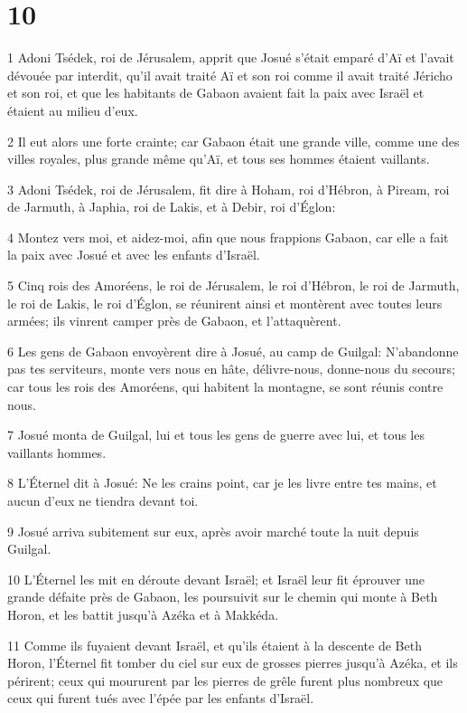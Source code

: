 \chapter{10}

\par 1 Adoni Tsédek, roi de Jérusalem, apprit que Josué s'était emparé d'Aï et l'avait dévouée par interdit, qu'il avait traité Aï et son roi comme il avait traité Jéricho et son roi, et que les habitants de Gabaon avaient fait la paix avec Israël et étaient au milieu d'eux.
\par 2 Il eut alors une forte crainte; car Gabaon était une grande ville, comme une des villes royales, plus grande même qu'Aï, et tous ses hommes étaient vaillants.
\par 3 Adoni Tsédek, roi de Jérusalem, fit dire à Hoham, roi d'Hébron, à Piream, roi de Jarmuth, à Japhia, roi de Lakis, et à Debir, roi d'Églon:
\par 4 Montez vers moi, et aidez-moi, afin que nous frappions Gabaon, car elle a fait la paix avec Josué et avec les enfants d'Israël.
\par 5 Cinq rois des Amoréens, le roi de Jérusalem, le roi d'Hébron, le roi de Jarmuth, le roi de Lakis, le roi d'Églon, se réunirent ainsi et montèrent avec toutes leurs armées; ils vinrent camper près de Gabaon, et l'attaquèrent.
\par 6 Les gens de Gabaon envoyèrent dire à Josué, au camp de Guilgal: N'abandonne pas tes serviteurs, monte vers nous en hâte, délivre-nous, donne-nous du secours; car tous les rois des Amoréens, qui habitent la montagne, se sont réunis contre nous.
\par 7 Josué monta de Guilgal, lui et tous les gens de guerre avec lui, et tous les vaillants hommes.
\par 8 L'Éternel dit à Josué: Ne les crains point, car je les livre entre tes mains, et aucun d'eux ne tiendra devant toi.
\par 9 Josué arriva subitement sur eux, après avoir marché toute la nuit depuis Guilgal.
\par 10 L'Éternel les mit en déroute devant Israël; et Israël leur fit éprouver une grande défaite près de Gabaon, les poursuivit sur le chemin qui monte à Beth Horon, et les battit jusqu'à Azéka et à Makkéda.
\par 11 Comme ils fuyaient devant Israël, et qu'ils étaient à la descente de Beth Horon, l'Éternel fit tomber du ciel sur eux de grosses pierres jusqu'à Azéka, et ils périrent; ceux qui moururent par les pierres de grêle furent plus nombreux que ceux qui furent tués avec l'épée par les enfants d'Israël.
